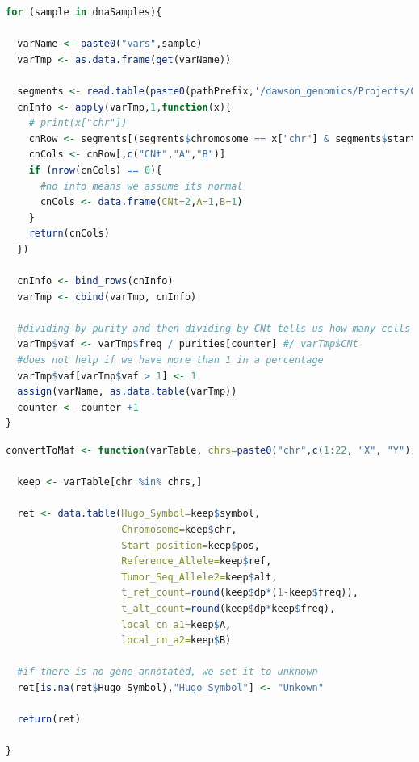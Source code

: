 \begin{lstlisting}[language=R, caption=annotate variants with copy number calls, label={lst-jvcAppendix:cnv}]
for (sample in dnaSamples){
  
  varName <- paste0("vars",sample)
  varTmp <- as.data.frame(get(varName))
  
  segments <- read.table(paste0(pathPrefix,'/dawson_genomics/Projects/CASCADE/', .sampleBase, '/analysis/', .sampleBase, "-",  sample, '/CNV/', .sampleBase,"-",sample,"_segments.txt"),header=T)
  cnInfo <- apply(varTmp,1,function(x){
    # print(x["chr"])
    cnRow <- segments[(segments$chromosome == x["chr"] & segments$start.pos <= as.numeric(x["pos"]) & segments$end.pos >= as.numeric(x["pos"])),]
    cnCols <- cnRow[,c("CNt","A","B")]
    if (nrow(cnCols) == 0){
      #no info means we assume its normal
      cnCols <- data.frame(CNt=2,A=1,B=1)
    }
    return(cnCols)
  })
  
  cnInfo <- bind_rows(cnInfo)
  varTmp <- cbind(varTmp, cnInfo)
  
  #dividing by purity and then dividing by CNt tells us how many cells have that variant
  varTmp$vaf <- varTmp$freq / purities[counter] #/ varTmp$CNt
  #does not help if we have more than 1 in a percentage
  varTmp$vaf[varTmp$vaf > 1] <- 1
  assign(varName, as.data.table(varTmp))
  counter <- counter +1
}
\end{lstlisting}

\begin{lstlisting}[language=R, caption=convert to maf format, label={lst-jvcAppendix:convertMAF}]
convertToMaf <- function(varTable, chrs=paste0("chr",c(1:22, "X", "Y"))){

  keep <- varTable[chr %in% chrs,]

  ret <- data.table(Hugo_Symbol=keep$symbol,
                    Chromosome=keep$chr,
                    Start_position=keep$pos,
                    Reference_Allele=keep$ref,
                    Tumor_Seq_Allele2=keep$alt,
                    t_ref_count=round(keep$dp*(1-keep$freq)),
                    t_alt_count=round(keep$dp*keep$freq),
                    local_cn_a1=keep$A,
                    local_cn_a2=keep$B)

  #if there is no gene annotated, we set it to unknown
  ret[is.na(ret$Hugo_Symbol),"Hugo_Symbol"] <- "Unkown"

  return(ret)

}
\end{lstlisting}



